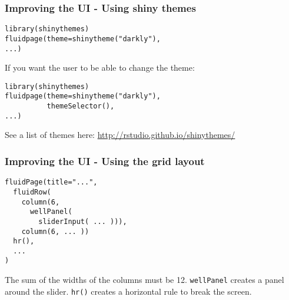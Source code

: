 \documentclass{beamer}
\begin{document}
	\begin{frame}[fragile]
		\frametitle{Improving the UI - Using shiny themes}
		
		\begin{exampleblock}{}
		\begin{BVerbatim}
library(shinythemes)
fluidpage(theme=shinytheme("darkly"),
...)
		\end{BVerbatim}
		\end{exampleblock}{}

		\vspace{2em}

		If you want the user to be able to change the theme:
		
		\begin{exampleblock}{}
		\begin{BVerbatim}
library(shinythemes)
fluidpage(theme=shinytheme("darkly"),
          themeSelector(),
...)
		\end{BVerbatim}
		\end{exampleblock}{}

		\vspace{2em}

		See a list of themes here: \href{http://rstudio.github.io/shinythemes/}{http://rstudio.github.io/shinythemes/}
 	
	\end{frame}

	\begin{frame}[fragile]
		\frametitle{Improving the UI - Using the grid layout}
		
		\begin{exampleblock}{}
		\begin{BVerbatim}
fluidPage(title="...",
  fluidRow(
    column(6,
      wellPanel(
        sliderInput( ... ))),
    column(6, ... ))
  hr(),
  ...
)      
		\end{BVerbatim}
		\end{exampleblock}{}

		\vspace{1em}

		The sum of the  widths of the columns must be 12. \verb|wellPanel| creates a panel around the slider. \verb|hr()| creates a horizontal rule to break the screen.

	\end{frame}
\end{document}
